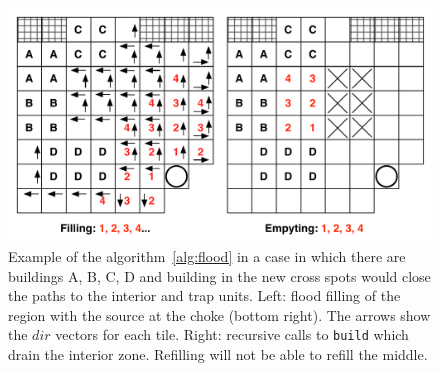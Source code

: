 \begin{figure}[!h]
\begin{center}
\includegraphics[width=13cm]{images/flow_buildings_placer.pdf}
\caption{Example of the algorithm~\ref{alg:flood} in a case in which there are buildings A, B, C, D and building in the new cross spots would close the paths to the interior and trap units. Left: flood filling of the region with the source at the choke (bottom right). The arrows show the $dir$ vectors for each tile. Right: recursive calls to \texttt{build} which drain the interior zone. Refilling will not be able to refill the middle.}
\label{fig:buildingsplacer}
\end{center}
\end{figure}



